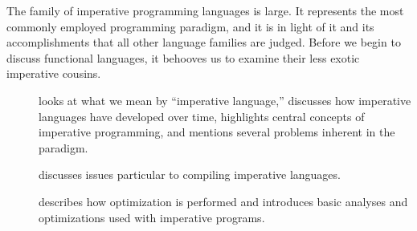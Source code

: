 \label{imperative:overview}
The family of imperative programming languages is large. It represents the most commonly employed programming paradigm, and it is in light of it and its accomplishments that all other language families are judged. Before we begin to discuss functional languages, it behooves us to examine their less exotic imperative cousins.
\begin{description}
\item[] looks at what we mean by ``imperative language,'' discusses how imperative languages have developed over time, highlights central concepts of imperative programming, and mentions several problems inherent in the paradigm.%
\item[] discusses issues particular to compiling imperative languages.
\item[] describes how optimization is performed and introduces basic analyses and optimizations used with imperative programs.%
\end{description}